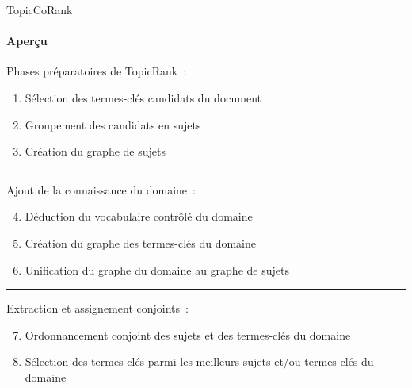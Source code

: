 \begin{frame}{TopicCoRank}\framesubtitle{Aperçu}
  Phases préparatoires de TopicRank~:
  \begin{enumerate}
    \item{Sélection des termes-clés candidats du document}
    \item{Groupement des candidats en sujets}
    \item{Création du graphe de sujets}
  \end{enumerate}
  \vspace{.25em}\hrule\vspace{.5em}
  Ajout de la connaissance du domaine~:
  \begin{enumerate}
    \setcounter{enumi}{3}
    \item{Déduction du vocabulaire contrôlé du domaine}
    \item{Création du graphe des termes-clés du domaine}
    \item{Unification du graphe du domaine au graphe de sujets}
  \end{enumerate}
  \vspace{.25em}\hrule\vspace{.5em}
  Extraction et assignement conjoints~:
  \begin{enumerate}
    \setcounter{enumi}{6}
    \item{Ordonnancement conjoint des sujets et des termes-clés du domaine}
    \item{Sélection des termes-clés parmi les meilleurs sujets et/ou termes-clés
          du domaine}
  \end{enumerate}
\end{frame}

